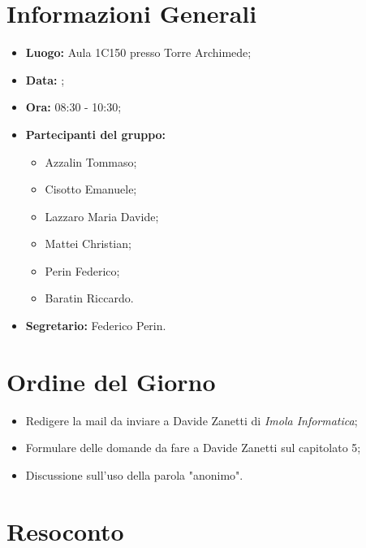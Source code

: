 \section{Informazioni Generali}
\begin{itemize}
\item \textbf{Luogo:} Aula 1C150 presso Torre Archimede;
\item \textbf{Data:} \Data;
\item \textbf{Ora:} 08:30 - 10:30;
\item \textbf{Partecipanti del gruppo:}
	\begin{itemize}
	\item Azzalin Tommaso; 
	\item Cisotto Emanuele;
	\item Lazzaro Maria Davide;
	\item Mattei Christian;
	\item Perin Federico;
	\item Baratin Riccardo.
	\end{itemize} 
\item \textbf{Segretario:} Federico Perin.
\end{itemize}

\section{Ordine del Giorno}
\begin{itemize}
\item Redigere la mail da inviare a Davide Zanetti di \textit{Imola Informatica};
\item Formulare delle domande da fare a Davide Zanetti sul capitolato 5;
\item Discussione sull'uso della parola "anonimo".
\end{itemize}

\section{Resoconto}
